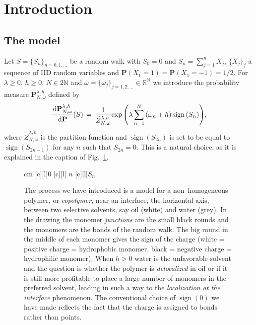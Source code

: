 \documentclass[reqno,11pt]{amsart}
\numberwithin{equation}{section}
\DeclareMathOperator{\sign}{\mathrm{sign}}
\newcommand{\R}{\mathbb{R}}
\newcommand{\N}{\mathbb{N}}
\renewcommand{\tilde}{\widetilde}
\newcommand{\bP}{{\ensuremath{\mathbf P}} }
\newcommand{\dd}{\,\text{\rm d}}             %
\newcommand{\go}{\omega}
\newcommand{\gl}{\lambda}
\begin{document}
\section{Introduction}
\label{sec:intro}
\setcounter{equation}{0}




\subsection{The model}


Let $S=\{S_n \}_{n=0,1,\ldots}$ be a random walk
with $S_0=0$ and $S_n=\sum_{j=1}^n X_j$, $\{ X_j\}_j$ a sequence
of IID random variables and $\bP \left( X_1=  1\right)=\bP \left( X_1=  -1\right)=1/2$.
For $\gl\ge 0$,  $h \ge 0$, $N\in 2\N$  and
$\go =\{ \go_j\}_{j=1,2, \ldots} \in \R ^\N$
we introduce the probability measure $\bP _{N, \go}^{\gl,h}$ defined by
\begin{equation}
\label{eq:Boltzmann}
\frac {\dd \bP_{N, \go}^{\gl, h}} {\dd \bP} (S)
\, = \,
\frac 1
{{\tilde Z}_{N,\go}^{\gl,h}}
{\exp\left( \gl \sum_{n=1}^N \left( \go_n +h\right) \sign \left(S_n\right)
\right)}
,
\end{equation}
where ${\tilde Z}_{N,\go}^{\gl, h}$ is the partition function and
$\sign \left(S_{2n}\right)$ is set to be equal to $\sign \left(S_{2n-1}\right)$
for any $n$ such that $S_{2n}=0$. This is a natural choice, as it is explained in the caption of
Fig.~\ref{fig:cop_bonds}.

\begin{figure}[h]
\begin{center}
\leavevmode
{} cm
\psfragscanon
{}[c][l]{$0$}
[c][l]{ $n$}
[c][l]{$S_n$}
\end{center}
\caption{\label{fig:cop_bonds}
The process we have introduced
is a model for a non--homogeneous polymer, or {\sl copolymer},
near an interface, the horizontal axis, between two selective solvents, say oil (white) and water (grey).
 In the drawing the monomer {\sl junctions} are the small black rounds and the monomers are the bonds of the random walk. The big round in the middle of each monomer
gives the sign of the charge  (white = positive charge = hydrophobic monomer, black = negative charge = hydrophilic monomer). When $h > 0$ water is  the unfavorable solvent and the question
is whether the polymer is {\sl delocalized} in oil or if it is still more profitable
to place a large number of monomers in the preferred solvent, leading in such a way
to the {\sl localization at the interface} phenomenon.
The conventional  choice of $\sign(0)$ we have made reflects the fact that
the charge is assigned to bonds rather than points.  }
\end{figure}
\end{document}
